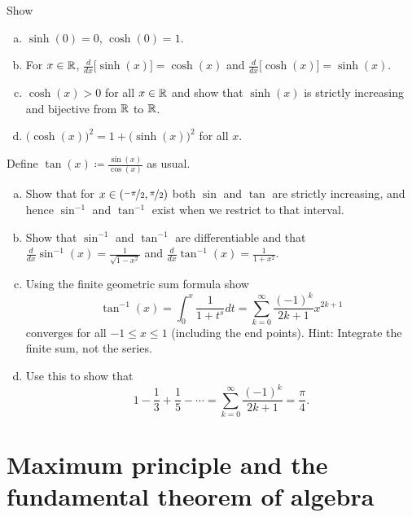 \begin{exercise}
Show
\begin{enumerate}[a)]
\item
$\sinh(0) = 0$, $\cosh(0) = 1$.
\item
For $x \in {\mathbb{R}}$,
$\frac{d}{dx} \bigl[ \sinh(x) \bigr] = \cosh(x)$ and
$\frac{d}{dx} \bigl[ \cosh(x) \bigr] = \sinh(x)$.
\item
$\cosh(x) > 0$ for all $x \in {\mathbb{R}}$ and show that
$\sinh(x)$ is strictly increasing and bijective
from ${\mathbb{R}}$ to ${\mathbb{R}}$.
\item
${\bigl(\cosh(x)\bigr)}^2 = 1 + {\bigl(\sinh(x)\bigr)}^2$ for all
$x$.
\end{enumerate}
\end{exercise}

\begin{exercise}
Define $\tan(x) \coloneqq \frac{\sin(x)}{\cos(x)}$ as usual.
\begin{enumerate}[a)]
\item
Show that for $x \in (\nicefrac{-\pi}{2},\nicefrac{\pi}{2})$
both $\sin$ and $\tan$ are strictly increasing, and hence $\sin^{-1}$
and $\tan^{-1}$ exist when we restrict to that interval.
\item
Show that $\sin^{-1}$ and $\tan^{-1}$ are differentiable
and
that
$\frac{d}{dx} \sin^{-1}(x) = \frac{1}{\sqrt{1-x^2}}$ and
$\frac{d}{dx} \tan^{-1}(x) = \frac{1}{1+x^2}$.
\item
Using the finite geometric sum formula show
\begin{equation*}
\tan^{-1}(x) = \int_0^x \frac{1}{1+t^s} dt
=
\sum_{k=0}^\infty \frac{{(-1)}^k}{2k+1} x^{2k+1}
\end{equation*}
converges for all $-1 \leq x \leq 1$ (including the end points).
Hint: Integrate the finite sum, not the series.
\item
Use this to show that
\begin{equation*}
1 - \frac{1}{3} + \frac{1}{5} - \cdots
=
\sum_{k=0}^\infty \frac{{(-1)}^k}{2k+1}
=
\frac{\pi}{4} .
\end{equation*}
\end{enumerate}
\end{exercise}


\sectionnewpage
\section{Maximum principle and the fundamental theorem of algebra}
\label{sec:fundalgeb}

